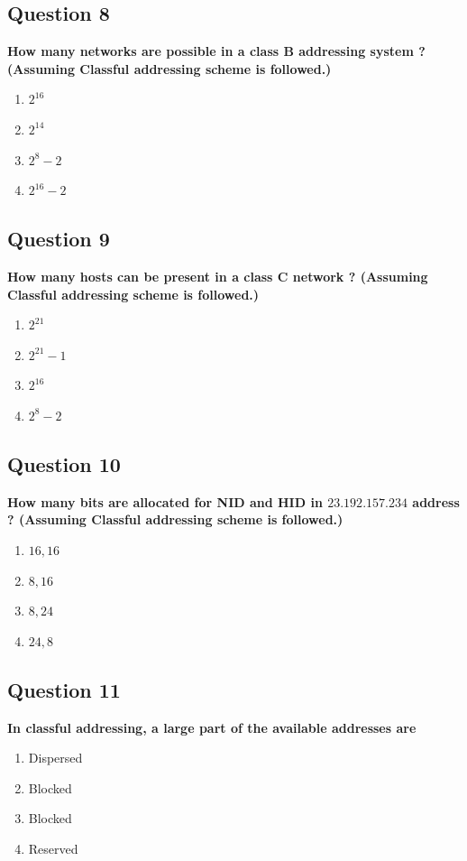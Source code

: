 \documentclass[12pt]{article}
\begin{document}
\subsection*{Question 8}
\textbf{How many networks are possible in a class B addressing system ?
(Assuming Classful addressing scheme is followed.)}
\begin{enumerate}[label=(\Alph*)]
    \item $2^{16}$
    \item $2^{14}$
    \item $2^8-2$
    \item $2^{16} - 2$
\end{enumerate}

\subsection*{Question 9}
\textbf{How many hosts can be present in a class C network ? (Assuming
Classful addressing scheme is followed.)}
\begin{enumerate}[label=(\Alph*)]
    \item $2^{21}$
    \item ${2^{21}- 1}$
    \item $2^{16}$
    \item $2^8-2$
\end{enumerate}

\subsection*{Question 10}
\textbf{How many bits are allocated for NID and HID in $23.192.157.234$
address ? (Assuming Classful addressing scheme is followed.)}
\begin{enumerate}[label=(\Alph*)]
    \item $16, 16$
    \item $8,16$
    \item $8,24$
    \item $24, 8$
\end{enumerate}

\subsection*{Question 11}
\textbf{In classful addressing, a large part of the available addresses are}\
\begin{enumerate}[label=(\Alph*)]
    \item Dispersed
    \item Blocked
    \item Blocked
    \item Reserved
\end{enumerate}
\end{document}
